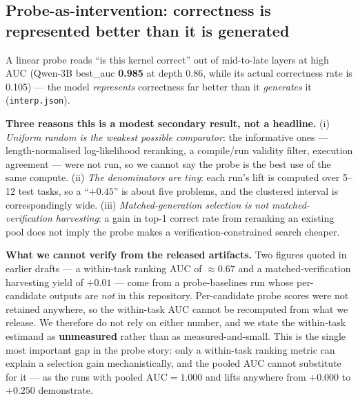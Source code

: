 \subsection{Probe-as-intervention: correctness is represented better than it is generated}
A linear probe reads ``is this kernel correct'' out of mid-to-late layers at high AUC (Qwen-3B best\_auc
\textbf{0.985} at depth 0.86, while its actual correctness rate is 0.105) --- the model \emph{represents}
correctness far better than it \emph{generates} it (\texttt{interp.json}).


\noindent\textbf{Three reasons this is a modest secondary result, not a headline.} (i) \emph{Uniform random is
the weakest possible comparator}: the informative ones --- length-normalised log-likelihood reranking, a
compile/run validity filter, execution agreement --- were not run, so we cannot say the probe is the best use
of the same compute. (ii) \emph{The denominators are tiny}: each run's lift is computed over 5--12 test tasks,
so a ``$+0.45$'' is about five problems, and the clustered interval is correspondingly wide. (iii)
\emph{Matched-generation selection is not matched-verification harvesting}: a gain in top-1 correct rate from
reranking an existing pool does not imply the probe makes a verification-constrained search cheaper.

\noindent\textbf{What we cannot verify from the released artifacts.} Two figures quoted in earlier drafts --- a
within-task ranking AUC of ${\approx}0.67$ and a matched-verification harvesting yield of ${+}0.01$ --- come
from a probe-baselines run whose per-candidate outputs are \emph{not} in this repository. Per-candidate probe
scores were not retained anywhere, so the within-task AUC cannot be recomputed from what we release. We
therefore do not rely on either number, and we state the within-task estimand as \textbf{unmeasured} rather
than as measured-and-small. This is the single most important gap in the probe story: only a within-task
ranking metric can explain a selection gain mechanistically, and the pooled AUC cannot substitute for it ---
as the runs with pooled $\mathrm{AUC}{=}1.000$ and lifts anywhere from $+0.000$ to $+0.250$ demonstrate.

